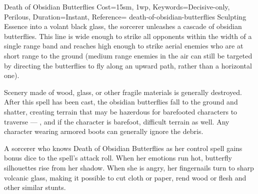 \begin{Spell}{Death of Obsidian Butterflies}{%
    Cost={15sm, 1wp},
    Keywords={Decisive-only, Perilous},
    Duration=Instant,
    Reference=\cite*[p.~472]{ex3}
}{death-of-obsidian-butterflies}
    Sculpting Essence into a volant black glass, the sorcerer unleashes a
    cascade of obsidian butterflies.  This line is wide enough to strike all opponents within the width
    of a single range band and reaches high enough to strike aerial enemies who
    are at short range to the ground (medium range enemies in the air can still
    be targeted by directing the butterflies to fly along an upward path,
    rather than a horizontal one). 

     Scenery
    made of wood, glass, or other fragile materials is generally destroyed.
    After this spell has been cast, the obsidian butterflies fall to the ground
    and shatter, creating terrain that may be hazerdous for barefooted
    characters to traverse --- , and if the character is
    barefoot, difficult terrain as well. Any character wearing armored boots
    can generally ignore the debris.

    \begin{Unavailable}
        A sorcerer who knows Death of Obsidian Butterflies as her control spell
        gains  bonus dice to the spell's attack roll.
        When her emotions run hot, butterfly silhouettes rise from her shadow.
        When she is angry, her fingernails turn to sharp volcanic glass, making
        it possible to cut cloth or paper, rend wood or flesh and other similar
        stunts.
    \end{Unavailable}
\end{Spell}


